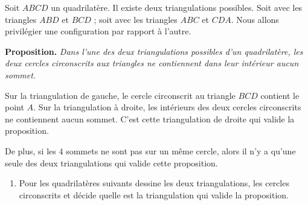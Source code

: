 \documentclass[class=report,crop=false, 12pt]{standalone}
\begin{document}
\begin{activite}

Soit $ABCD$ un quadrilatère. Il existe deux triangulations possibles.
Soit avec les triangles $ABD$ et $BCD$ ; soit avec les triangles $ABC$ et $CDA$.
Nous allons privilégier une configuration par rapport à l'autre.



\begin{center}
\begin{minipage}{0.9\textwidth}
\textbf{Proposition.}
\emph{
Dans l'une des deux triangulations possibles d'un quadrilatère, les deux cercles circonscrits aux triangles ne contiennent dans leur intérieur aucun sommet.
}
\end{minipage}
\end{center}

Sur la triangulation de gauche, le cercle circonscrit au triangle $BCD$ 
 contient le point $A$.
Sur la triangulation à droite, les intérieurs des deux cercles circonscrits ne contiennent aucun sommet. C'est cette triangulation de droite qui valide la proposition. 


De plus, si les $4$ sommets ne sont pas sur un même cercle, alors il n'y a qu'une seule des deux triangulations qui valide cette proposition.


\begin{enumerate}
  \item Pour les quadrilatères suivants dessine les deux triangulations, les cercles circonscrits et décide quelle est la triangulation qui valide la proposition.
  
\bigskip
\bigskip
\bigskip
\bigskip
 

\bigskip
\bigskip
\bigskip
\bigskip

 

\bigskip
\bigskip
\bigskip
\bigskip


\end{enumerate}
\end{activite}
\end{document}
